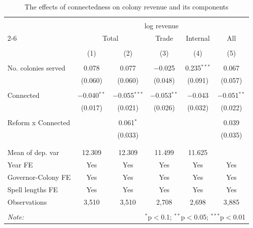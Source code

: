 \documentclass[a4paper]{article}\usepackage[]{graphicx}\usepackage[]{xcolor}
\begin{document}
\begin{table}[!htbp] \centering 
  \caption{The effects of connectedness on colony revenue and its components} 
  \label{tab:rev} 
\scriptsize 
\begin{tabular}{@{\extracolsep{5pt}}lccccc} 
\\[-1.8ex]\hline 
\hline \\[-1.8ex] 
 & \multicolumn{5}{c}{log revenue} \\ 
\cline{2-6} 
 & \multicolumn{2}{c}{Total} & Trade & Internal & All \\ 
\\[-1.8ex] & (1) & (2) & (3) & (4) & (5)\\ 
\hline \\[-1.8ex] 
 No. colonies served & 0.078 & 0.077 & $-$0.025 & 0.235$^{***}$ & 0.067 \\ 
  & (0.060) & (0.060) & (0.048) & (0.091) & (0.057) \\ 
  & & & & & \\ 
 Connected & $-$0.040$^{**}$ & $-$0.055$^{***}$ & $-$0.053$^{**}$ & $-$0.043 & $-$0.051$^{**}$ \\ 
  & (0.017) & (0.021) & (0.026) & (0.032) & (0.022) \\ 
  & & & & & \\ 
 Reform x Connected &  & 0.061$^{*}$ &  &  & 0.039 \\ 
  &  & (0.033) &  &  & (0.035) \\ 
  & & & & & \\ 
\hline \\[-1.8ex] 
Mean of dep. var & 12.309 & 12.309 & 11.499 & 11.625 &  \\ 
Year FE & Yes & Yes & Yes & Yes & Yes \\ 
Governor-Colony FE & Yes & Yes & Yes & Yes & Yes \\ 
Spell lengths FE & Yes & Yes & Yes & Yes & Yes \\ 
Observations & 3,510 & 3,510 & 2,708 & 2,698 & 3,885 \\ 
\hline 
\hline \\[-1.8ex] 
\textit{Note:}  & \multicolumn{5}{r}{$^{*}$p$<$0.1; $^{**}$p$<$0.05; $^{***}$p$<$0.01} \\ 
\end{tabular} 
\end{table} 
\end{document}
